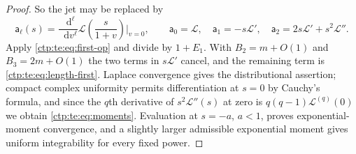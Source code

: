 \documentclass[11pt,a4paper]{article}
\numberwithin{equation}{section}
\theoremstyle{definition}
\theoremstyle{remark}
\newcommand{\dd}{\mathop{}\!\mathrm d}
\newcommand{\LW}{\mathcal L}
\begin{document}
\begin{proof}
So the jet may be replaced by
\begin{equation}\label{ctp:te:eq:length-jet}
 \mathsf a_\ell(s)=\frac{\dd^\ell}{\dd v^\ell}\LW\!\left(\frac s{1+v}\right)\Big|_{v=0},
 \qquad \mathsf a_0=\LW,\quad\mathsf a_1=-s\LW',\quad\mathsf a_2=2s\LW'+s^2\LW''.
\end{equation}
Apply \eqref{ctp:te:eq:first-op} and divide by $1+E_1$. With $B_2=m+O(1)$
and $B_3=2m+O(1)$ the two terms in $s\LW'$ cancel, and the remaining term is
\eqref{ctp:te:eq:length-first}. Laplace convergence gives the
distributional assertion; compact complex uniformity permits differentiation
at $s=0$ by Cauchy's formula, and since the $q$th derivative of
$s^2\LW''(s)$ at zero is $q(q-1)\LW^{(q)}(0)$ we obtain
\eqref{ctp:te:eq:moments}. Evaluation at $s=-a$, $a<1$, proves
exponential-moment convergence, and a slightly larger admissible exponential
moment gives uniform integrability for every fixed power.
\end{proof}
\end{document}
